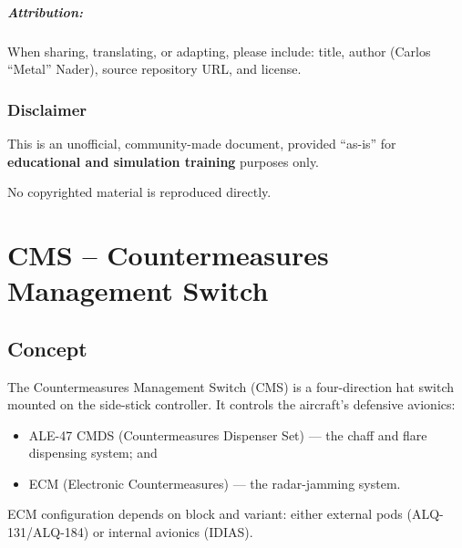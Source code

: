 \documentclass[11pt, a4paper, twoside]{report}
\begin{document}
\paragraph{Attribution:}
When sharing, translating, or adapting, please include: title, author (Carlos ``Metal'' Nader), source repository URL, and license.

\subsection{Disclaimer}
\label{sec:C1-S4-S4}

This is an unofficial, community-made document, provided ``as-is'' for \textbf{educational and simulation training} purposes only.

No copyrighted material is reproduced directly.

\chapter{CMS – Countermeasures Management Switch}
\label{chap:C5}

\section{Concept}
\label{sec:C5-S1}

The Countermeasures Management Switch (CMS) is a four-direction hat switch mounted on the side-stick controller. It controls the aircraft's defensive avionics:

\begin{itemize}
  \item ALE-47 CMDS (Countermeasures Dispenser Set) --- the chaff and flare dispensing system; and
  \item ECM (Electronic Countermeasures) --- the radar-jamming system.
\end{itemize}

ECM configuration depends on block and variant: either external pods (ALQ-131/ALQ-184) or internal avionics (IDIAS).
\end{document}
